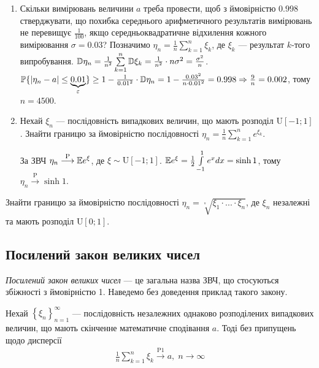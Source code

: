 \begin{example}
    \begin{enumerate}
        \item Скільки вимірювань величини $a$ треба провести, щоб з ймовірністю $0.998$ стверджувати, що похибка середнього арифметичного результатів
        вимірювань не перевищує $\frac{1}{100}$, якщо середньоквадратичне відхилення кожного вимірювання $\sigma = 0.03$?
        Позначимо $\eta_n = \frac{1}{n}\sum\limits_{k=1}^n \xi_k$, де $\xi_k$ --- результат $k$-того випробування.
        $\mathbb{D}\eta_n = \frac{1}{n^2} \sum\limits_{k=1}^n \mathbb{D}\xi_k = \frac{1}{n^2} \cdot n\sigma^2 = \frac{\sigma^2}{n}$.
        $\mathbb{P}\{\left|\eta_n - a \right| \leq \underbrace{0.01}_{\varepsilon}\} \geq 1 - \frac{1}{0.01^2}\cdot \mathbb{D}\eta_n =
        1 - \frac{0.03^2}{n\cdot 0.01^2} = 0.998 \Rightarrow \frac{9}{n} = 0.002$, тому $n = 4500$.
        \item Нехай $\xi_n$ --- послідовність випадкових величин, що мають розподіл $\mathrm{U}[-1; 1]$. Знайти границю за
        ймовірністю послідовності $\eta_n = \frac{1}{n}\sum\limits_{k=1}^n e^{\xi_k}$.

        За ЗВЧ $\eta_n \overset{\mathrm{P}}{\longrightarrow} \mathbb{E} e^\xi$, де $\xi \sim \mathrm{U}[-1; 1]$. 
        $\mathbb{E} e^\xi = \frac{1}{2}\int\limits_{-1}^1 e^x dx = \sinh{1}$, тому $\eta_n \overset{\mathrm{P}}{\longrightarrow} \sinh{1}$.
    \end{enumerate}
\end{example}
\begin{exercise}
    Знайти границю за ймовірністю послідовності $\eta_n = \sqrt[^n]{\xi_1 \cdot ... \cdot \xi_n}$, де $\xi_n$ незалежні та мають розподіл $\mathrm{U}[0;1]$.
\end{exercise}


\subsection{Посилений закон великих чисел}
\emph{Посилений закон великих чисел} --- це загальна назва ЗВЧ, що стосуються збіжності з ймовірністю 1. Наведемо без доведення приклад такого закону.
\begin{theorem*}
    Нехай $\left\{ \xi_n\right\}_{n=1}^{\infty}$ --- послідовність незалежних однаково розподілених випадкових величин, що мають скінченне
    математичне сподівання $a$. Тоді без припущень щодо дисперсії
    \begin{gather}\label{Kolm_theor}
        \frac{1}{n}\sum\limits_{k=1}^n \xi_k \overset{\mathrm{P1}}{\longrightarrow} a, \; n \to \infty
    \end{gather}
\end{theorem*}

